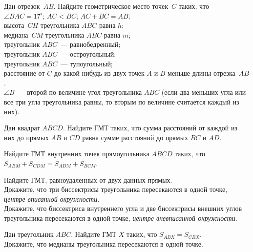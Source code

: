 \begin{problems}

\item
Дан отрезок~$AB$.
Найдите геометрическое место точек~$C$ таких, что
\\
\sp $\angle{BAC} = 17^{\circ}$;
\quad
\sp $AC < BC$;
\quad
\sp $AC + BC = AB$;
\\
\sp высота~$CH$ треугольника $ABC$ равна $h$;
\\
\sp медиана~$CM$ треугольника $ABC$ равна $m$;
\\
\sp треугольник $ABC$~--- равнобедренный;
\\
\sp треугольник $ABC$~--- остроугольный;
\\
\sp треугольник $ABC$~--- тупоугольный;
\\
\sp
расстояние от $C$ до какой-нибудь из двух точек $A$ и $B$ меньше длины
отрезка~$AB$.
\\
\sp
$\angle B $~--- второй по величине угол треугольника $ABC$
(если два меньших угла или все три угла треугольника равны, то вторым
по величине считается каждый из них).



\item
Дан квадрат $ABCD$.
Найдите ГМТ таких, что сумма расстояний от каждой из них до прямых $AB$ и $CD$
равна сумме расстояний до прямых $BC$ и $AD$.

\item
Найдите ГМТ внутренних точек прямоугольника $ABCD$ таких, что
$S_{ABM} + S_{CDM} = S_{ADM} + S_{BCM}$.

\item
\sp
Найдите ГМТ, равноудаленных от двух данных прямых.
\\
\sp
Докажите, что три биссектрисы треугольника пересекаются в одной точке,
\emph{центре вписанной окружности}.
\\
\sp
Докажите, что биссектриса внутреннего угла и две биссектрисы внешних углов
треугольника пересекаются в одной точке, \emph{центре вневписанной окружности}.

\item
\sp
Дан треугольник $ABC$.
Найдите ГМТ $X$ таких, что $S_{ABX} = S_{CBX}$.
\\
\sp
Докажите, что медианы треугольника пересекаются в одной точке.


\end{problems}
